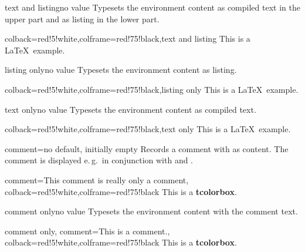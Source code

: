 \begin{docTcbKey}{text and listing}{}{no value}
  Typesets the environment content as compiled text in the upper part and
  as listing in the lower part.
\begin{dispExample}
\begin{tcblisting}{colback=red!5!white,colframe=red!75!black,text and listing}
This is a \LaTeX\ example.
\end{tcblisting}
\end{dispExample}
\end{docTcbKey}


\begin{docTcbKey}{listing only}{}{no value}
  Typesets the environment content as listing.
\begin{dispExample}
\begin{tcblisting}{colback=red!5!white,colframe=red!75!black,listing only}
This is a \LaTeX\ example.
\end{tcblisting}
\end{dispExample}
\end{docTcbKey}


\clearpage
\begin{docTcbKey}{text only}{}{no value}
  Typesets the environment content as compiled text.
\begin{dispExample}
\begin{tcblisting}{colback=red!5!white,colframe=red!75!black,text only}
This is a \LaTeX\ example.
\end{tcblisting}
\end{dispExample}
\end{docTcbKey}



\begin{docTcbKey}{comment}{=}{no default, initially empty}
  Records a comment with  as content. The comment is displayed
   e.\,g.\ in conjunction with 
  and .
\begin{dispExample}
\begin{tcblisting}{comment={This comment is really only a comment},
  colback=red!5!white,colframe=red!75!black}
This is a \textbf{tcolorbox}.
\end{tcblisting}
\end{dispExample}
\end{docTcbKey}


\begin{docTcbKey}[][doc new=2014-11-17]{comment only}{}{no value}
  Typesets the environment content with the comment text.
\begin{dispExample}
\begin{tcblisting}{comment only,
  comment={This is a comment.},
  colback=red!5!white,colframe=red!75!black}
This is a \textbf{tcolorbox}.
\end{tcblisting}
\end{dispExample}
\end{docTcbKey}



